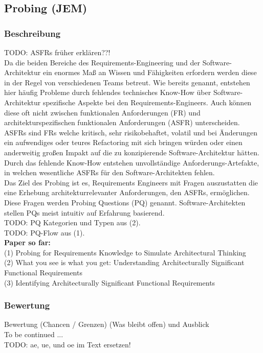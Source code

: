\subsection{Probing (JEM)}

\subsubsection{Beschreibung}

TODO: ASFRs früher erklären??! \\

Da die beiden Bereiche des Requirements-Engineering und der Software-Architektur ein enormes Maß an Wissen und Fähigkeiten erfordern werden diese in der Regel von verschiedenen Teams betreut. Wie bereits genannt, entstehen hier häufig Probleme durch fehlendes technisches Know-How über Software-Architektur spezifische Aspekte bei den Requirements-Engineers. Auch können diese oft nicht zwischen funktionalen Anforderungen (FR) und architekturspezifischen funktionalen Anforderungen (ASFR) unterscheiden. ASFRs sind FRs welche kritisch, sehr risikobehaftet, volatil und bei Änderungen ein aufwendiges oder teures Refactoring mit sich bringen würden oder einen anderweitig großen Impakt auf die zu konzipierende Software-Architektur hätten. Durch das fehlende Know-How entstehen unvollständige Anforderungs-Artefakte, in welchen wesentliche ASFRs für den Software-Architekten fehlen. \\

Das Ziel des Probing ist es, Requirements Engineers mit Fragen auszustatten die eine Erhebung architekturrelevanter Anforderungen, den ASFRs, ermöglichen. Diese Fragen werden Probing Questions (PQ) genannt. Software-Architekten stellen PQs meist intuitiv auf Erfahrung basierend. \\

TODO: PQ Kategorien und Typen aus (2). \\

TODO: PQ-Flow aus (1). \\




\textbf{Paper so far:} \\
(1) Probing for Requirements Knowledge to Simulate Architectural Thinking \\
(2) What you see is what you get: Understanding Architecturally Significant Functional Requirements \\
(3) Identifying Architecturally Significant Functional Requirements \\

\subsubsection{Bewertung}

Bewertung (Chancen / Grenzen) (Was bleibt offen) und Ausblick \\

To be continued ... \\

TODO: ae, ue, und oe im Text ersetzen! \\
